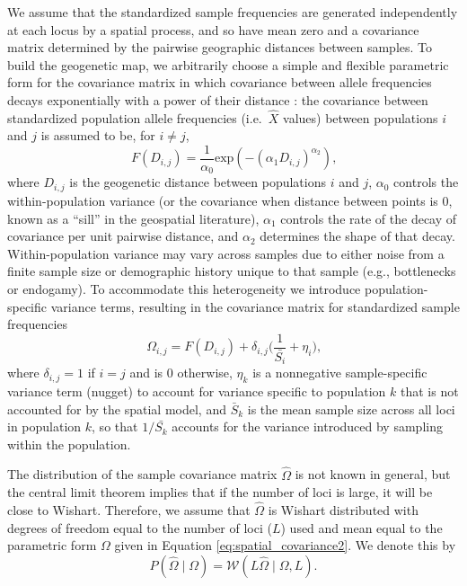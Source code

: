 \documentclass[10pt,letterpaper]{article}
\newcommand{\given}{\mid}
\begin{document}
We assume that the standardized sample frequencies are generated independently at each locus by a spatial process,
and so have mean zero and a covariance matrix determined by the pairwise geographic distances between samples. 
To build the geogenetic map, we arbitrarily choose a simple and flexible parametric form for the covariance matrix 
in which covariance between allele frequencies decays exponentially with a power of their distance
\cite{Diggle1998, Wasser2004, Bradburd2013}:
the covariance between standardized population allele frequencies (i.e.~$\hat X$ values) between populations $i$ and $j$ is assumed to be, for $i \neq j$,
\begin{equation}
\label{eq:spatial_covariance}
F(D_{i,j}) = \frac{1}{\alpha_0} \text{exp} \left(	-\left(\alpha_1 D_{i,j} \right)^{\alpha_2} \right) \text{,}
\end{equation}
where $D_{i,j}$ is the geogenetic distance between populations $i$ and $j$, 
$\alpha_0$ controls the within-population variance 
(or the covariance when distance between points is 0, known as a ``sill'' in the geospatial literature),
$\alpha_1$ controls the rate of the decay of covariance per unit pairwise distance, and $\alpha_2$ determines the shape of that decay.  
Within-population variance may vary across samples due to either noise from a finite sample size or demographic history unique to that sample (e.g., bottlenecks or endogamy).  
To accommodate this heterogeneity we introduce population-specific variance terms,
resulting in the covariance matrix for standardized sample frequencies
\begin{equation}
\label{eq:spatial_covariance2}
\Omega_{i,j} =F(D_{i,j}) + \delta_{i,j} \big(\frac{1}{\bar{S_{i}}} + \eta_{i} \big) \text{,}
\end{equation} 
where $\delta_{i,j}=1$ if $i=j$ and is $0$ otherwise,
$\eta_k$ is a nonnegative sample-specific variance term (nugget) to account for variance specific to population $k$ that is not accounted for by the spatial model,
and $\bar{S}_k$ is the mean sample size across all loci in population $k$,
so that $1/\bar{S_k}$ accounts for the variance introduced by sampling within the population.

The distribution of the sample covariance matrix $\hat \Omega$ is not known in general,
but the central limit theorem implies that if the number of loci is large, it will be close to Wishart.
Therefore, we assume that $\hat \Omega$ 
is Wishart distributed with degrees of freedom equal to the number of loci ($L$) used
and mean equal to the parametric form $\Omega$ given in Equation \eqref{eq:spatial_covariance2}.
We denote this by
\begin{equation}
\label{eq:wishart_dist}
P(\widehat{\Omega} \given \Omega) = \mathcal{W}\left( L\widehat{\Omega} \mid \Omega, L \right) .
\end{equation}
\end{document}
